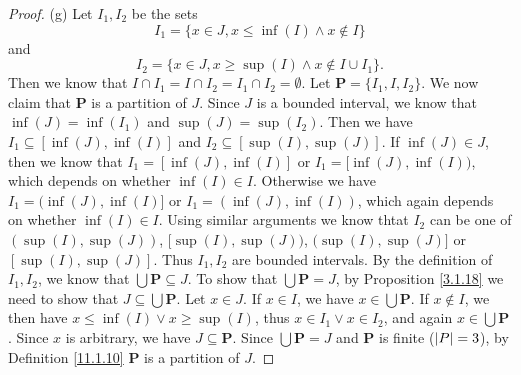 \begin{proof}{(g)}
    Let \(I_1, I_2\) be the sets
    \[
        I_1 = \{x \in J, x \leq \inf(I) \land x \notin I\}
    \]
    and
    \[
        I_2 = \{x \in J, x \geq \sup(I) \land x \notin I \cup I_1\}.
    \]
    Then we know that \(I \cap I_1 = I \cap I_2 = I_1 \cap I_2 = \emptyset\).
    Let \(\mathbf{P} = \{I_1, I, I_2\}\).
    We now claim that \(\mathbf{P}\) is a partition of \(J\).
    Since \(J\) is a bounded interval, we know that \(\inf(J) = \inf(I_1)\) and \(\sup(J) = \sup(I_2)\).
    Then we have \(I_1 \subseteq [\inf(J), \inf(I)]\) and \(I_2 \subseteq [\sup(I), \sup(J)]\).
    If \(\inf(J) \in J\), then we know that \(I_1 = [\inf(J), \inf(I)]\) or \(I_1 = [\inf(J), \inf(I))\), which depends on whether \(\inf(I) \in I\).
    Otherwise we have \(I_1 = (\inf(J), \inf(I)]\) or \(I_1 = (\inf(J), \inf(I))\), which again depends on whether \(\inf(I) \in I\).
    Using similar arguments we know thtat \(I_2\) can be one of \((\sup(I), \sup(J))\), \([\sup(I), \sup(J))\), \((\sup(I), \sup(J)]\) or \([\sup(I), \sup(J)]\).
    Thus \(I_1, I_2\) are bounded intervals.
    By the definition of \(I_1, I_2\), we know that \(\bigcup \mathbf{P} \subseteq J\).
    To show that \(\bigcup \mathbf{P} = J\), by Proposition \ref{3.1.18} we need to show that \(J \subseteq \bigcup \mathbf{P}\).
    Let \(x \in J\).
    If \(x \in I\), we have \(x \in \bigcup \mathbf{P}\).
    If \(x \notin I\), we then have \(x \leq \inf(I) \lor x \geq \sup(I)\), thus \(x \in I_1 \lor x \in I_2\), and again \(x \in \bigcup \mathbf{P}\).
    Since \(x\) is arbitrary, we have \(J \subseteq \mathbf{P}\).
    Since \(\bigcup \mathbf{P} = J\) and \(\mathbf{P}\) is finite (\(\abs*{P} = 3\)), by Definition \ref{11.1.10} \(\mathbf{P}\) is a partition of \(J\).


\end{proof}
